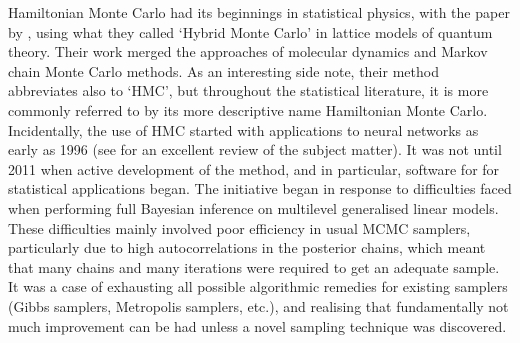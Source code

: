 Hamiltonian Monte Carlo had its beginnings in statistical physics, with the \citeyear{duane1987hybrid} paper by \citeauthor{duane1987hybrid}, using what they called `Hybrid Monte Carlo' in lattice models of quantum theory.
Their work merged the approaches of molecular dynamics and Markov chain Monte Carlo methods.
As an interesting side note, their method abbreviates also to `HMC', but throughout the statistical literature, it is more commonly referred to by its more descriptive name Hamiltonian Monte Carlo.
Incidentally, the use of HMC started with applications to neural networks as early as 1996 (see \cite{neal2011mcmc} for an excellent review of the subject matter).
It was not until 2011 when active development of the method, and in particular, software for for statistical applications began.
The  initiative \citep{carpenter2016stan} began in response to difficulties faced when performing full Bayesian inference on multilevel generalised linear models.
These difficulties mainly involved poor efficiency in usual MCMC samplers, particularly due to high autocorrelations in the posterior chains, which meant that many chains and many iterations were required to get an adequate sample.
It was a case of exhausting all possible algorithmic remedies for existing samplers (Gibbs samplers, Metropolis samplers, etc.), and realising that fundamentally not much improvement can be had unless a novel sampling technique was discovered.




